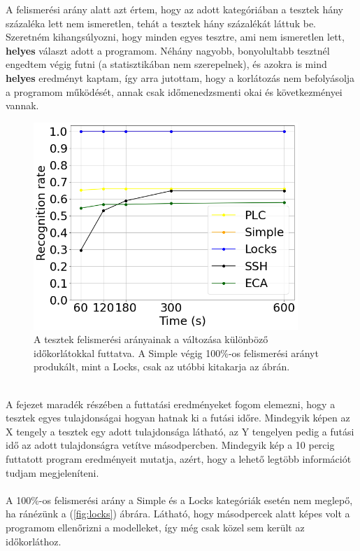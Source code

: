 A felismerési arány alatt azt értem, hogy az adott kategóriában a tesztek hány százaléka lett nem ismeretlen, tehát a tesztek hány százalékát láttuk be. Szeretném kihangsúlyozni, hogy minden egyes tesztre, ami nem ismeretlen lett, \textbf{helyes} választ adott a programom. Néhány nagyobb, bonyolultabb tesztnél engedtem végig futni (a statisztikában nem szerepelnek), és azokra is mind \textbf{helyes} eredményt kaptam, így arra jutottam, hogy a korlátozás nem befolyásolja a programom működését, annak csak időmenedzsmenti okai és következményei vannak.
\\
\begin{figure}[!ht]
	\centering
	\includegraphics[width=100mm, keepaspectratio]{figures/fig_rec_rate_during_time.png}
	\caption{A tesztek felismerési arányainak a változása különböző időkorlátokkal futtatva. A Simple végig 100\%-os felismerési arányt produkált, mint a Locks, csak az utóbbi kitakarja az ábrán.}
	\label{fig:rec_rate_during_time}
\end{figure}
\ \\
A fejezet maradék részében a futtatási eredményeket fogom elemezni, hogy a tesztek egyes tulajdonságai hogyan hatnak ki a futási időre. Mindegyik képen az X tengely a tesztek egy adott tulajdonsága látható, az Y tengelyen pedig a futási idő az adott tulajdonságra vetítve másodpercben. Mindegyik kép a 10 percig futtatott program eredményeit mutatja, azért, hogy a lehető legtöbb információt tudjam megjeleníteni.
\\
\\
A 100\%-os felismerési arány a Simple és a Locks kategóriák esetén nem meglepő, ha ránézünk a (\ref{fig:locks}) ábrára. Látható, hogy másodpercek alatt képes volt a programom ellenőrizni a modelleket, így még csak közel sem került az időkorláthoz.

